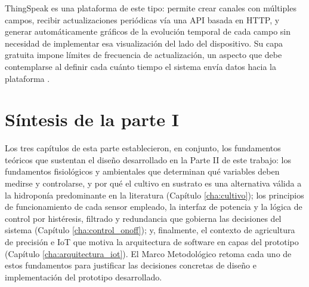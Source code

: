 ThingSpeak es una plataforma de este tipo: permite crear canales con múltiples campos, recibir actualizaciones periódicas vía una API basada en HTTP, y generar automáticamente gráficos de la evolución temporal de cada campo sin necesidad de implementar esa visualización del lado del dispositivo. Su capa gratuita impone límites de frecuencia de actualización, un aspecto que debe contemplarse al definir cada cuánto tiempo el sistema envía datos hacia la plataforma \cite{thingspeak_mathworks}.

\section{Síntesis de la parte I}

Los tres capítulos de esta parte establecieron, en conjunto, los fundamentos teóricos que sustentan el diseño desarrollado en la Parte II de este trabajo: los fundamentos fisiológicos y ambientales que determinan qué variables deben medirse y controlarse, y por qué el cultivo en sustrato es una alternativa válida a la hidroponía predominante en la literatura (Capítulo \ref{cha:cultivo}); los principios de funcionamiento de cada sensor empleado, la interfaz de potencia y la lógica de control por histéresis, filtrado y redundancia que gobierna las decisiones del sistema (Capítulo \ref{cha:control_onoff}); y, finalmente, el contexto de agricultura de precisión e IoT que motiva la arquitectura de software en capas del prototipo (Capítulo \ref{cha:arquitectura_iot}). El Marco Metodológico retoma cada uno de estos fundamentos para justificar las decisiones concretas de diseño e implementación del prototipo desarrollado.
